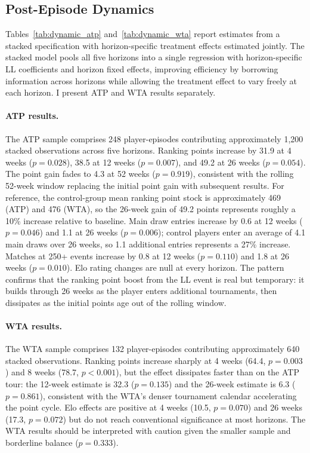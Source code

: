 \subsection{Post-Episode Dynamics}
\label{sec:results_dynamics}

Tables~\ref{tab:dynamic_atp} and~\ref{tab:dynamic_wta} report estimates from a stacked specification with horizon-specific treatment effects estimated jointly. The stacked model pools all five horizons into a single regression with horizon-specific LL coefficients and horizon fixed effects, improving efficiency by borrowing information across horizons while allowing the treatment effect to vary freely at each horizon. I present ATP and WTA results separately.

\paragraph{ATP results.} The ATP sample comprises 248 player-episodes contributing approximately 1,200 stacked observations across five horizons. Ranking points increase by 31.9 at 4 weeks ($p = 0.028$), 38.5 at 12 weeks ($p = 0.007$), and 49.2 at 26 weeks ($p = 0.054$). The point gain fades to 4.3 at 52 weeks ($p = 0.919$), consistent with the rolling 52-week window replacing the initial point gain with subsequent results. For reference, the control-group mean ranking point stock is approximately 469 (ATP) and 476 (WTA), so the 26-week gain of 49.2 points represents roughly a 10\% increase relative to baseline. Main draw entries increase by 0.6 at 12 weeks ($p = 0.046$) and 1.1 at 26 weeks ($p = 0.006$); control players enter an average of 4.1 main draws over 26 weeks, so 1.1 additional entries represents a 27\% increase. Matches at 250+ events increase by 0.8 at 12 weeks ($p = 0.110$) and 1.8 at 26 weeks ($p = 0.010$). Elo rating changes are null at every horizon. The pattern confirms that the ranking point boost from the LL event is real but temporary: it builds through 26 weeks as the player enters additional tournaments, then dissipates as the initial points age out of the rolling window.

\paragraph{WTA results.} The WTA sample comprises 132 player-episodes contributing approximately 640 stacked observations. Ranking points increase sharply at 4 weeks (64.4, $p = 0.003$) and 8 weeks (78.7, $p < 0.001$), but the effect dissipates faster than on the ATP tour: the 12-week estimate is 32.3 ($p = 0.135$) and the 26-week estimate is 6.3 ($p = 0.861$), consistent with the WTA's denser tournament calendar accelerating the point cycle. Elo effects are positive at 4 weeks (10.5, $p = 0.070$) and 26 weeks (17.3, $p = 0.072$) but do not reach conventional significance at most horizons. The WTA results should be interpreted with caution given the smaller sample and borderline balance ($p = 0.333$).

